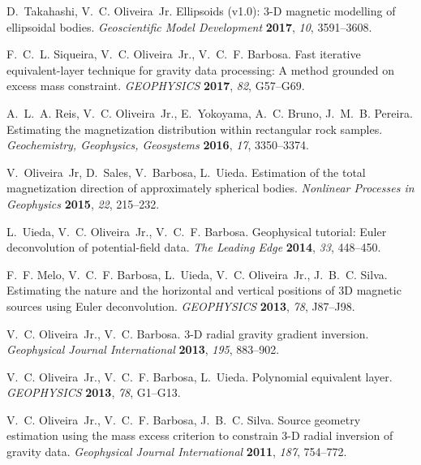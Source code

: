
\nocite{*}

%
\begin{thebibliography}{10}
	
	
	D.~Takahashi, V.~C. Oliveira~Jr. Ellipsoids (v1.0): 3-{D} magnetic modelling of
	ellipsoidal bodies. \emph{Geoscientific Model Development} \textbf{2017},
	\emph{10}, 3591--3608.
	
	F.~C.~L. Siqueira, V.~C. Oliveira~Jr., V.~C.~F. Barbosa. Fast iterative
	equivalent-layer technique for gravity data processing: {A} method grounded
	on excess mass constraint. \emph{GEOPHYSICS} \textbf{2017}, \emph{82},
	G57--G69.
	
	A.~L.~A. Reis, V.~C. Oliveira~Jr., E.~Yokoyama, A.~C. Bruno, J.~M.~B. Pereira.
	Estimating the magnetization distribution within rectangular rock samples.
	\emph{Geochemistry, Geophysics, Geosystems} \textbf{2016}, \emph{17},
	3350--3374.
	
	V.~Oliveira~Jr, D.~Sales, V.~Barbosa, L.~Uieda. Estimation of the total
	magnetization direction of approximately spherical bodies. \emph{Nonlinear
		Processes in Geophysics} \textbf{2015}, \emph{22}, 215--232.
	
	L.~Uieda, V.~C. Oliveira~Jr., V.~C.~F. Barbosa. Geophysical tutorial: {Euler}
	deconvolution of potential-field data. \emph{The Leading Edge} \textbf{2014},
	\emph{33}, 448--450.
	
	F.~F. Melo, V.~C.~F. Barbosa, L.~Uieda, V.~C. Oliveira~Jr., J.~B.~C. Silva.
	Estimating the nature and the horizontal and vertical positions of 3D
	magnetic sources using {Euler} deconvolution. \emph{GEOPHYSICS}
	\textbf{2013}, \emph{78}, J87--J98.
	
	V.~C. Oliveira~Jr., V.~C. Barbosa. 3-{D} radial gravity gradient inversion.
	\emph{Geophysical Journal International} \textbf{2013}, \emph{195}, 883--902.
	
	V.~C. Oliveira~Jr., V.~C.~F. Barbosa, L.~Uieda. Polynomial equivalent layer.
	\emph{GEOPHYSICS} \textbf{2013}, \emph{78}, G1--G13.
	
	V.~C. Oliveira~Jr., V.~C.~F. Barbosa, J.~B.~C. Silva. Source geometry
	estimation using the mass excess criterion to constrain 3-{D} radial
	inversion of gravity data. \emph{Geophysical Journal International}
	\textbf{2011}, \emph{187}, 754--772.
	
\end{thebibliography}

